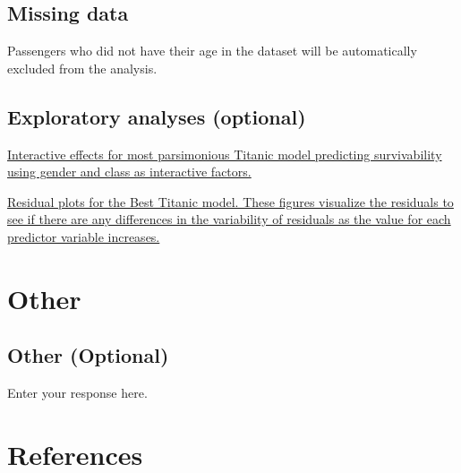 \documentclass[]{article}
\begin{document}
\hypertarget{missing-data}{%
\subsection{Missing data}\label{missing-data}}

Passengers who did not have their age in the dataset will be
automatically excluded from the analysis.

\hypertarget{exploratory-analyses-optional}{%
\subsection{Exploratory analyses
(optional)}\label{exploratory-analyses-optional}}

\href{Interactive\%20effects\%20of\%20Best\%20Titanic\%20model.png}{Interactive
effects for most parsimonious Titanic model predicting survivability
using gender and class as interactive factors.}

\href{Residual\%20plots\%20for\%20the\%20Best\%20titanic\%20model.png}{Residual
plots for the Best Titanic model. These figures visualize the residuals
to see if there are any differences in the variability of residuals as
the value for each predictor variable increases.}

\hypertarget{other}{%
\section{Other}\label{other}}

\hypertarget{other-optional}{%
\subsection{Other (Optional)}\label{other-optional}}

Enter your response here.

\hypertarget{references}{%
\section{References}\label{references}}

\hypertarget{section}{%
\subsection{}\label{section}}

\vspace{-2pc}
\setlength{\parindent}{-0.5in}
\setlength{\leftskip}{-1in}
\setlength{\parskip}{8pt}
\end{document}
